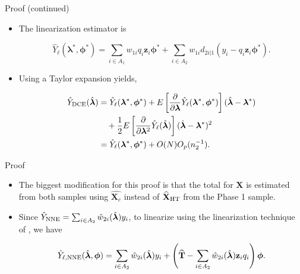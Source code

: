 \documentclass{beamer} %
\renewcommand{\bf}[1]{\mathbf{#1}}
\begin{document}
\begin{frame}{Proof (continued)}
  \begin{itemize}
    \item The linearization estimator is

  $$\hat Y_\ell(\bm \lambda^*, \bm \phi^*) = 
  \sum_{i \in A_1} w_{1i} q_i \bf z_i \bm \phi^* +
  \sum_{i \in A_2} w_{1i} d_{2i|1} (y_i - q_i \bf z_i \bm \phi^*).$$

  \item Using a Taylor expansion yields,

  \begin{align*}
    \hat Y_{\rm{DCE}}(\hat{\bm \lambda}) 
    &= \hat Y_\ell(\bm \lambda^*, \bm \phi^*) + 
    E\left[\frac{\partial}{\partial \bm \lambda}\hat Y_\ell(\bm \lambda^*,
    \bm \phi^*)\right](\hat{\bm \lambda} - \bm \lambda^*) \\ 
    &\quad+ \frac{1}{2}
    E\left[\frac{\partial}{\partial \bm \lambda^2} 
    \hat Y_{\ell}(\tilde{\bm \lambda})\right] 
    (\hat{\bm \lambda} - \bm \lambda^*)^2\\
    &= \hat Y_\ell(\bm \lambda^*, \bm \phi^*) + O(N)O_p(n_2^{-1}).
  \end{align*}

  \end{itemize}
\end{frame}

\begin{frame}{Proof}

  \begin{itemize}
    \item The biggest modification for this proof is that the total for $\bf X$
      is estimated from both samples using $\widehat{\bf X_c}$ instead of 
      $\widehat{\bf X}_{\rm{HT}}$ from the Phase 1 sample.
    \item Since $\hat Y_{\rm{NNE}} = \sum_{i \in A_2} \hat w_{2i}(\hat{\bm
      \lambda})y_i$, to linearize using the 
      linearization technique of \cite{randles1982asymptotic}, we have

      $$\hat Y_{\ell, \rm{NNE}} (\hat{\bm \lambda}, \bm \phi) = \sum_{i \in A_2} \hat
    w_{2i}(\hat{\bm \lambda}) y_i + \left(\widehat{\bf T} - \sum_{i \in A_2} \hat
    w_{2i}(\hat{\bm \lambda}) \bf z_i q_i\right) \bm \phi.$$

  \end{itemize}

\end{frame}
\end{document}
